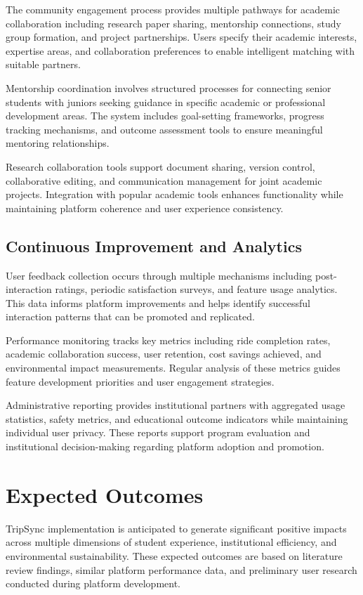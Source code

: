 \documentclass[conference]{IEEEtran}
\begin{document}
The community engagement process provides multiple pathways for academic collaboration including research paper sharing, mentorship connections, study group formation, and project partnerships. Users specify their academic interests, expertise areas, and collaboration preferences to enable intelligent matching with suitable partners.

Mentorship coordination involves structured processes for connecting senior students with juniors seeking guidance in specific academic or professional development areas. The system includes goal-setting frameworks, progress tracking mechanisms, and outcome assessment tools to ensure meaningful mentoring relationships.

Research collaboration tools support document sharing, version control, collaborative editing, and communication management for joint academic projects. Integration with popular academic tools enhances functionality while maintaining platform coherence and user experience consistency.

\subsection{Continuous Improvement and Analytics}

User feedback collection occurs through multiple mechanisms including post-interaction ratings, periodic satisfaction surveys, and feature usage analytics. This data informs platform improvements and helps identify successful interaction patterns that can be promoted and replicated.

Performance monitoring tracks key metrics including ride completion rates, academic collaboration success, user retention, cost savings achieved, and environmental impact measurements. Regular analysis of these metrics guides feature development priorities and user engagement strategies.

Administrative reporting provides institutional partners with aggregated usage statistics, safety metrics, and educational outcome indicators while maintaining individual user privacy. These reports support program evaluation and institutional decision-making regarding platform adoption and promotion.

\section{Expected Outcomes}

TripSync implementation is anticipated to generate significant positive impacts across multiple dimensions of student experience, institutional efficiency, and environmental sustainability. These expected outcomes are based on literature review findings, similar platform performance data, and preliminary user research conducted during platform development.
\end{document}
